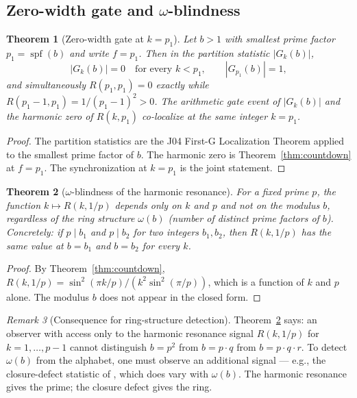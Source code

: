 \documentclass[11pt,reqno]{amsart}
\theoremstyle{plain}
\newtheorem{theorem}{Theorem}[section]
\theoremstyle{definition}
\theoremstyle{remark}
\newtheorem{remark}[theorem]{Remark}
\DeclareMathOperator{\spf}{spf}
\begin{document}
\subsection{Zero-width gate and \texorpdfstring{$\omega$}{omega}-blindness}
\label{sec:zerowidth-and-omegablind}

\begin{theorem}[Zero-width gate at $k = p_1$]
\label{thm:zerowidth}
Let $b > 1$ with smallest prime factor $p_1 = \spf(b)$ and write
$f = p_1$. Then in the partition statistic $|G_k(b)|$,
\[
  |G_k(b)| = 0 \quad \text{for every } k < p_1,
  \qquad
  |G_{p_1}(b)| = 1,
\]
and simultaneously $R(p_1, p_1) = 0$ exactly while
$R(p_1 - 1, p_1) = 1/(p_1 - 1)^2 > 0$. The arithmetic gate event of
$|G_k(b)|$ and the harmonic zero of $R(k, p_1)$ co-localize at the
same integer $k = p_1$.
\end{theorem}

\begin{proof}
The partition statistics are the J04 \cite[Theorem~3.1]{J04Sanders}
First-G Localization Theorem applied to the smallest prime factor
of $b$. The harmonic zero is Theorem~\ref{thm:countdown} at
$f = p_1$. The synchronization at $k = p_1$ is the joint statement.
\end{proof}

\begin{theorem}[$\omega$-blindness of the harmonic resonance]
\label{thm:omegablind}
For a fixed prime $p$, the function $k \mapsto R(k, 1/p)$ depends
only on $k$ and $p$ and not on the modulus $b$, regardless of the
ring structure $\omega(b)$ (number of distinct prime factors of $b$).
Concretely: if $p \mid b_1$ and $p \mid b_2$ for two integers
$b_1, b_2$, then $R(k, 1/p)$ has the same value at $b = b_1$ and
$b = b_2$ for every $k$.
\end{theorem}

\begin{proof}
By Theorem~\ref{thm:countdown}, $R(k, 1/p) = \sin^2(\pi k / p) /
(k^2 \sin^2(\pi/p))$, which is a function of $k$ and $p$ alone.
The modulus $b$ does not appear in the closed form.
\end{proof}

\begin{remark}[Consequence for ring-structure detection]
\label{rem:omega-detection}
Theorem~\ref{thm:omegablind} says: an observer with access only to
the harmonic resonance signal $R(k, 1/p)$ for $k = 1, \ldots, p-1$
cannot distinguish $b = p^2$ from $b = p \cdot q$ from
$b = p \cdot q \cdot r$. To detect $\omega(b)$ from the alphabet,
one must observe an additional signal --- e.g., the closure-defect
statistic of \cite[\S6]{Sanders2026WP35}, which does vary with
$\omega(b)$. The harmonic resonance gives the prime; the closure
defect gives the ring.
\end{remark}
\end{document}
